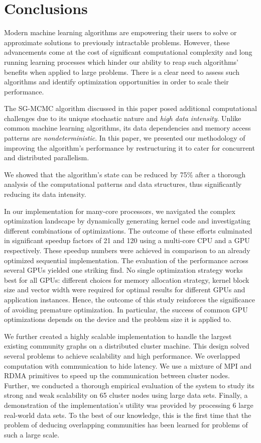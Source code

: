 \section{Conclusions}
\label{sec-conclusion}

Modern machine learning algorithms are empowering their
users to solve or approximate solutions to previously intractable problems.
However, these advancements come at the cost of significant computational
complexity and long running learning processes which hinder our ability to reap
such algorithms' benefits when applied to large problems. There is a clear need
to assess such algorithms and identify optimization opportunities in order to
scale their performance.

The SG-MCMC algorithm discussed in this paper posed additional computational
challenges due to its unique stochastic nature and \emph{high data intensity}. Unlike
common machine learning algorithms, its data dependencies and memory access
patterns are \emph{nondeterministic}. In this paper, we presented our methodology of
improving the algorithm's performance by restructuring it to
cater for concurrent and distributed parallelism.

We showed that the algorithm's state can be reduced by 75\% after a thorough
analysis of the computational patterns and data structures, thus significantly
reducing its data intensity.

In our implementation for many-core processors, we navigated the complex optimization
landscape by dynamically generating kernel code and investigating different
combinations of optimizations. The outcome of these efforts culminated in
significant speedup factors of 21 and 120 using a multi-core CPU and a GPU
respectively. These speedup numbers were achieved in comparison to an already
optimized sequential implementation. The evaluation of the performance
across several GPUs yielded one striking find. No single optimization strategy
works best for all GPUs: different choices for memory allocation strategy,
kernel block size and vector width were required for optimal results for
different GPUs and application instances.
%
Hence, the outcome of this study reinforces the significance of avoiding premature
optimization. In particular, the success
of common GPU optimizations depends on the device and the
problem size it is applied to.

We further created a highly scalable implementation to handle the largest existing
community graphs on a distributed cluster machine.
This design solved
several problems to achieve scalability and high performance.
We overlapped computation
with communication to hide latency.  We use a
mixture of MPI and RDMA primitives to speed up the communication between cluster
nodes.
%
Further, we conducted a thorough empirical evaluation of the system to study its strong
and weak scalability on 65 cluster nodes using large data sets.
Finally, a
demonstration of the implementation's utility was provided by processing 6
large real-world data sets.
To the best of
our knowledge, this is the first time that the problem of deducing overlapping
communities has been learned for problems of such a large scale.
